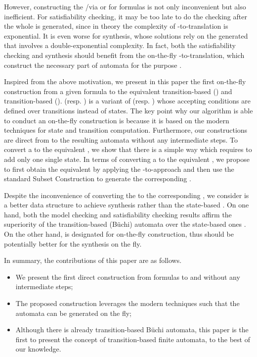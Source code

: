 However, constructing the \NFA/\DFA via \spot or \mona for \ltlf formulas is not only inconvenient but also inefficient. For \ltlf satisfiability checking, it may be too late to do the checking after the whole \NFA is generated, since in theory the complexity of \ltlf-to-\NFA translation is exponential. It is even worse for \ltlf synthesis, whose solutions rely on the generated \DFA that involves a double-exponential complexity. In fact, both the \ltlf satisfiability checking and \ltlf synthesis should benefit from the on-the-fly \ltlf-to-\DFA translation, which construct the necessary part of automata for the purpose \cite{GPVW95}.  

Inspired from the above motivation, we present in this paper the first on-the-fly construction from a given \ltlf formula to the equivalent transition-based \NFA (\TNFA) and transition-based \DFA (\TDFA). \TNFA (resp. \TDFA) is a variant of \NFA (resp. \DFA) whose accepting conditions are defined over transitions instead of states. The key point why our algorithm is able to conduct an on-the-fly construction is because it is based on the modern \SAT techniques for state and transition computation. Furthermore, our constructions are direct from \ltlf to the resulting automata without any intermediate steps. To convert a \TNFA to the equivalent \NFA, we show that there is a simple way which requires to add only one single state. In terms of converting a \TDFA to the equivalent \DFA, we propose to first obtain the equivalent \NFA by applying the \TNFA-to-\NFA approach and then use the standard Subset Construction \cite{RS59} to generate the corresponding \DFA.   

Despite the inconvenience of converting the \TDFA to the corresponding \DFA, we consider \TDFA is a better data structure to achieve \ltlf synthesis rather than the state-based \DFA. On one hand, both the \ltl model checking and \ltl satisfiability checking results affirm the superiority of the transition-based (B\"uchi) automata over the state-based ones \cite{GL02}. On the other hand, \TDFA is designated for on-the-fly construction, thus should be potentially better for the synthesis on the fly. 

In summary, the contributions of this paper are as follows.
\begin{itemize}
	\item We present the first direct construction from \ltlf formulas to \TNFA and \TDFA without any intermediate steps;
	\item The proposed construction leverages the modern \SAT techniques such that the automata can be generated on the fly;
	\item Although there is already transition-based B\"uchi automata, this paper is the first to present the concept of transition-based finite automata, to the best of our knowledge.
\end{itemize}

